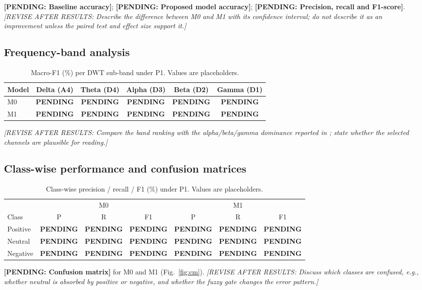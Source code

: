 \documentclass[11pt,a4paper]{article}
\newcommand{\pending}[1]{\textcolor{red!75!black}{\textbf{[PENDING: #1]}}}
\newcommand{\revise}[1]{\textcolor{orange!80!black}{\textit{[REVISE AFTER RESULTS: #1]}}}
\newcommand{\PND}{\textcolor{red!75!black}{\textbf{PENDING}}}
\begin{document}
\pending{Baseline accuracy}; \pending{Proposed model accuracy}; \pending{Precision, recall and F1-score}. \revise{Describe the difference between M0 and M1 with its confidence interval; do not describe it as an improvement unless the paired test and effect size support it.}

\subsection{Frequency-band analysis}
\begin{table}[t]
\centering\small
\caption{Macro-F1 (\%) per DWT sub-band under P1. Values are placeholders.}\label{tab:bands}
\begin{tabular}{@{}lccccc@{}}
\toprule
Model & Delta (A4) & Theta (D4) & Alpha (D3) & Beta (D2) & Gamma (D1)\\
\midrule
M0 & \PND & \PND & \PND & \PND & \PND\\
M1 & \PND & \PND & \PND & \PND & \PND\\
\bottomrule
\end{tabular}
\end{table}
\revise{Compare the band ranking with the alpha/beta/gamma dominance reported in \cite{FarhadiSedehi2024a}; state whether the selected channels are plausible for reading.}

\subsection{Class-wise performance and confusion matrices}
\begin{table}[t]
\centering\small
\caption{Class-wise precision / recall / F1 (\%) under P1. Values are placeholders.}\label{tab:class}
\begin{tabular}{@{}lcccccc@{}}
\toprule
 & \multicolumn{3}{c}{M0} & \multicolumn{3}{c}{M1}\\
\cmidrule(lr){2-4}\cmidrule(lr){5-7}
Class & P & R & F1 & P & R & F1\\
\midrule
Positive & \PND & \PND & \PND & \PND & \PND & \PND\\
Neutral  & \PND & \PND & \PND & \PND & \PND & \PND\\
Negative & \PND & \PND & \PND & \PND & \PND & \PND\\
\bottomrule
\end{tabular}
\end{table}
\pending{Confusion matrix} for M0 and M1 (Fig.~\ref{fig:cm}). \revise{Discuss which classes are confused, e.g., whether neutral is absorbed by positive or negative, and whether the fuzzy gate changes the error pattern.}
\end{document}
